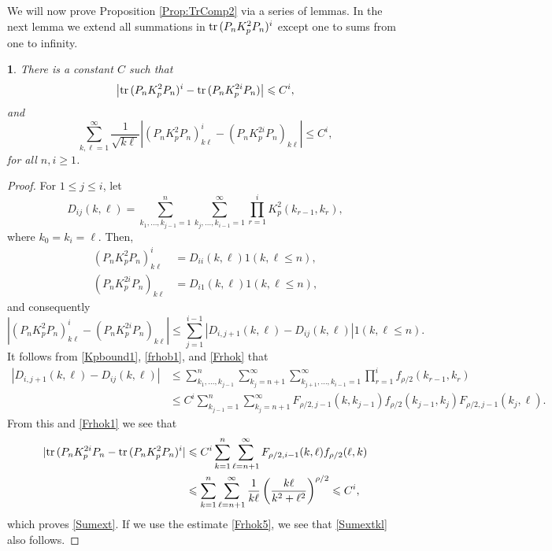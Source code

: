 \documentclass{article}
\numberwithin{equation}{section}
\numberwithin{figure}{section}
\theoremstyle{plain}
\theoremstyle{plain}
\newtheorem{lemma}[thm]{\protect\lemmaname}
\numberwithin{thm}{section}
\theoremstyle{remark}
\providecommand{\lemmaname}{Lemma}
\newcommand{\Tr}{\text{{\rm tr\,}}}
\let \le \leqslant
\let \ge \geqslant
\begin{document}
We will now prove Proposition \ref{Prop:TrComp2} via a series of lemmas. In the next lemma we extend all summations in $\Tr(P_nK_p^2P_n)^i$ except one to sums
from one to infinity.
\begin{lemma}\label{Lem:Sumext}
There is a constant $C$ such that
\begin{equation}\label{Sumext}
\left|\Tr(P_nK_p^2P_n)^i-\Tr(P_nK_p^{2i}P_n)\right|\le C^i,
\end{equation}
and 
\begin{equation}\label{Sumextkl}
    \sum_{k,\ell=1}^\infty\frac 1{\sqrt{k\ell}}\left|(P_nK_p^2P_n)^i_{k\ell}-(P_nK_p^{2i}P_n)_{k\ell}\right| \le C^i,   
\end{equation}
for all $n, i\ge 1$.
\end{lemma}

\begin{proof}
For $1\le j\le i$, let
\begin{equation*}
D_{ij}(k,\ell)=\sum_{k_1,\dots,k_{j-1}=1}^n\sum_{k_j,\dots,k_{i-1}=1}^\infty\prod_{r=1}^{i}K_p^2(k_{r-1},k_r),
\end{equation*}
where $k_0=k_i=\ell$. 
Then,
\begin{align*}
 (P_nK_p^2P_n)^i_{k\ell}&=D_{ii}(k,\ell)1(k,\ell\le n),\\
 (P_nK_p^{2i}P_n)_{k\ell}&=D_{i1}(k,\ell)1(k,\ell\le n),
\end{align*}
and consequently
\begin{equation*}
    |(P_nK_p^2P_n)^i_{k\ell}-(P_nK_p^{2i}P_n)_{k\ell}|\le\sum_{j=1}^{i-1}|D_{i,j+1}(k,\ell)-D_{ij}(k,\ell)|1(k,\ell\le n).
\end{equation*}
It follows from \eqref{Kpbound1}, \eqref{frhob1}, and \eqref{Frhok} that
\begin{align*}
|D_{i,j+1}(k,\ell)-D_{ij}(k,\ell)|&\le
\sum_{k_1,\dots,k_{j-1}}^n\sum_{k_j=n+1}^\infty\sum_{k_{j+1},\dots,k_{i-1}=1}^\infty\prod_{r=1}^i f_{\rho/2}(k_{r-1},k_r)\\
&\le C^i   \sum_{k_{j-1}=1}^n\sum_{k_j=n+1}^\infty F_{\rho/2,j-1}(k,k_{j-1})f_{\rho/2}(k_{j-1},k_j)F_{\rho/2,j-1}(k_j,\ell).
\end{align*}
From this and \eqref{Frhok1} we see that
\begin{align*}
    |\Tr(P_nK_p^{2i}P_n-\Tr(P_nK_p^2P_n)^i|&\le C^i \sum_{k=1}^n\sum_{\ell=n+1}^\infty F_{\rho/2,i-1}(k,\ell)f_{\rho/2}(\ell,k)\\
    &\le \sum_{k=1}^n\sum_{\ell=n+1}^\infty\frac 1{k\ell}\left(\frac{k\ell}{k^2+\ell^2}\right)^{\rho/2}\le C^i,
\end{align*}
which proves \eqref{Sumext}. If we use the estimate \eqref{Frhok5}, we see that \eqref{Sumextkl} also follows.

\end{proof}
\end{document}
